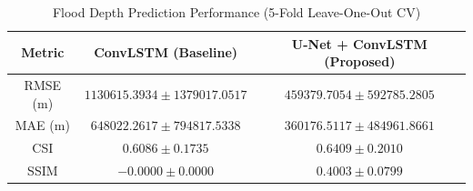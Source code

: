 
\begin{table}[ht]
\centering
\caption{Flood Depth Prediction Performance (5-Fold Leave-One-Out CV)}
\begin{tabular}{ccc}
\hline
\textbf{Metric} & \textbf{ConvLSTM (Baseline)} & \textbf{U-Net + ConvLSTM (Proposed)} \\
\hline
RMSE (m) & $1130615.3934 \pm 1379017.0517$ & $459379.7054 \pm 592785.2805$ \\
MAE (m) & $648022.2617 \pm 794817.5338$ & $360176.5117 \pm 484961.8661$ \\
CSI & $0.6086 \pm 0.1735$ & $0.6409 \pm 0.2010$ \\
SSIM & $-0.0000 \pm 0.0000$ & $0.4003 \pm 0.0799$ \\
\hline
\end{tabular}
\end{table}
